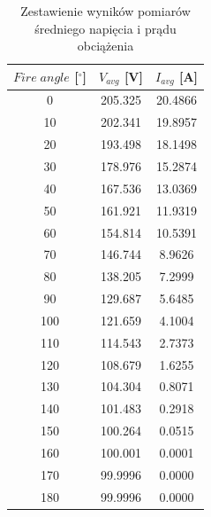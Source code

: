 \documentclass[11pt]{article}
\begin{document}
\begin{table}[H]
\centering
\caption{Zestawienie wyników pomiarów średniego napięcia i prądu obciążenia}
\begin{tabular}{|c|c|c|}
\hline
\textbf{$Fire\;angle$ [$^\circ$]} & \textbf{$V_{avg}$ [V]} & \textbf{$I_{avg}$ [A]} \\
\hline
0   & 205.325  & 20.4866   \\
10  & 202.341  & 19.8957   \\
20  & 193.498  & 18.1498   \\
30  & 178.976  & 15.2874   \\
40  & 167.536  & 13.0369   \\
50  & 161.921  & 11.9319   \\
60  & 154.814  & 10.5391   \\
70  & 146.744  & 8.9626    \\
80  & 138.205  & 7.2999    \\
90  & 129.687  & 5.6485    \\
100 & 121.659  & 4.1004    \\
110 & 114.543  & 2.7373    \\
120 & 108.679  & 1.6255    \\
130 & 104.304  & 0.8071    \\
140 & 101.483  & 0.2918    \\
150 & 100.264  & 0.0515    \\
160 & 100.001  & 0.0001    \\
170 & 99.9996  & 0.0000    \\
180 & 99.9996  & 0.0000    \\
\hline
\end{tabular}
\label{tab:tabela_fire_angle}
\end{table}
\end{document}
